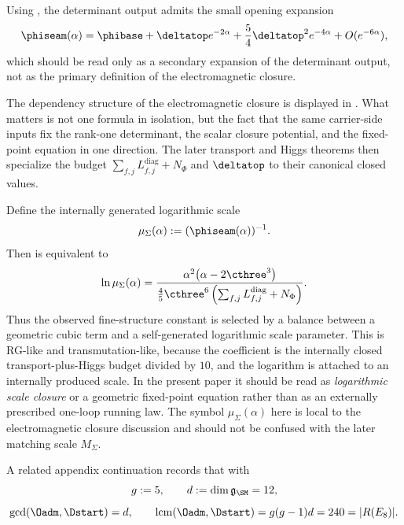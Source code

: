 \begin{remark}
Using , the determinant output admits the small
opening expansion
\[
\phiseam(\alpha)
=
\phibase
+\deltatop e^{-2\alpha}
+\frac54\deltatop^2e^{-4\alpha}
+O(e^{-6\alpha}),
\]
which should be read only as a secondary expansion of the determinant output, not as the primary
definition of the electromagnetic closure.
\end{remark}

The dependency structure of the electromagnetic closure is displayed in
. What matters is not one formula in isolation, but the fact that
the same carrier-side inputs fix the rank-one determinant, the scalar closure potential, and the
fixed-point equation in one direction. The later transport and Higgs theorems then specialize the
budget $\sum_{f,j}L_{f,j}^{\mathrm{diag}}+N_\Phi$ and $\deltatop$ to their canonical closed values.
\begin{remark}
Define the internally generated logarithmic scale
\[
\mu_\Sigma(\alpha):=(\phiseam(\alpha))^{-1}.
\]
Then  is equivalent to
\[
\ln \mu_\Sigma(\alpha)
=
\frac{\alpha^2\bigl(\alpha-2\cthree^3\bigr)}
{\frac45\cthree^6\left(\sum_{f,j}L_{f,j}^{\mathrm{diag}}+N_\Phi\right)}.
\]
Thus the observed fine-structure constant is selected by a balance between a geometric cubic term
and a self-generated logarithmic scale parameter. This is RG-like and transmutation-like,
because the coefficient is the internally closed transport-plus-Higgs budget divided by $10$, and
the logarithm is attached to an internally produced scale. In the present paper it should be read
as \emph{logarithmic scale closure} or a geometric fixed-point equation rather than as an externally
prescribed one-loop running law. The symbol $\mu_\Sigma(\alpha)$ here is local to the
electromagnetic closure discussion and should not be confused with the later matching scale
$M_\Sigma$.
\end{remark}
A related appendix continuation records that with
\[
g:=5,
\qquad
d:=\dim \mathfrak g_{\SM}=12,
\]
\[
\gcd(\Oadm,\Dstart)=d,
\qquad
\operatorname{lcm}(\Oadm,\Dstart)=g(g-1)d=240=|R(E_8)|.
\]

